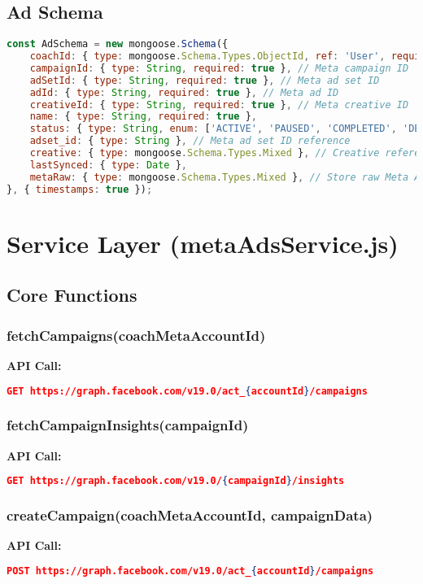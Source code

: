 \documentclass[11pt,a4paper]{article}
\begin{document}
\subsection{Ad Schema}
\begin{lstlisting}[language=JavaScript]
const AdSchema = new mongoose.Schema({
    coachId: { type: mongoose.Schema.Types.ObjectId, ref: 'User', required: true },
    campaignId: { type: String, required: true }, // Meta campaign ID
    adSetId: { type: String, required: true }, // Meta ad set ID
    adId: { type: String, required: true }, // Meta ad ID
    creativeId: { type: String, required: true }, // Meta creative ID
    name: { type: String, required: true },
    status: { type: String, enum: ['ACTIVE', 'PAUSED', 'COMPLETED', 'DELETED'], default: 'DRAFT' },
    adset_id: { type: String }, // Meta ad set ID reference
    creative: { type: mongoose.Schema.Types.Mixed }, // Creative reference
    lastSynced: { type: Date },
    metaRaw: { type: mongoose.Schema.Types.Mixed }, // Store raw Meta API response
}, { timestamps: true });
\end{lstlisting}

\section{Service Layer (metaAdsService.js)}
\subsection{Core Functions}

\subsubsection{fetchCampaigns(coachMetaAccountId)}
\textbf{API Call:}
\begin{lstlisting}[language=json]
GET https://graph.facebook.com/v19.0/act_{accountId}/campaigns
\end{lstlisting}

\subsubsection{fetchCampaignInsights(campaignId)}
\textbf{API Call:}
\begin{lstlisting}[language=json]
GET https://graph.facebook.com/v19.0/{campaignId}/insights
\end{lstlisting}

\subsubsection{createCampaign(coachMetaAccountId, campaignData)}
\textbf{API Call:}
\begin{lstlisting}[language=json]
POST https://graph.facebook.com/v19.0/act_{accountId}/campaigns
\end{lstlisting}
\end{document}
